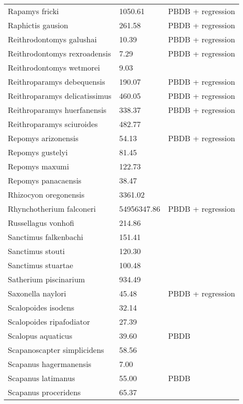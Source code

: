 \documentclass{article}
\begin{document}
\begin{center}
\begin{longtable}{p{} p{} p{} }
  Rapamys fricki & 1050.61 & PBDB + regression \\ 
  Raphictis gausion & 261.58 & PBDB + regression \\ 
  Reithrodontomys galushai & 10.39 & PBDB + regression \\ 
  Reithrodontomys rexroadensis & 7.29 & PBDB + regression \\ 
  Reithrodontomys wetmorei & 9.03 & \cite{Tomiya2013} \\ 
  Reithroparamys debequensis & 190.07 & PBDB + regression \\ 
  Reithroparamys delicatissimus & 460.05 & PBDB + regression \\ 
  Reithroparamys huerfanensis & 338.37 & PBDB + regression \\ 
  Reithroparamys sciuroides & 482.77 & \cite{Wang1994a} \\ 
  Repomys arizonensis & 54.13 & PBDB + regression \\ 
  Repomys gustelyi & 81.45 & \cite{Tomiya2013} \\ 
  Repomys maxumi & 122.73 & \cite{Tomiya2013} \\ 
  Repomys panacaensis & 38.47 & \cite{Tomiya2013} \\ 
  Rhizocyon oregonensis & 3361.02 & \cite{Tomiya2013} \\ 
  Rhynchotherium falconeri & 54956347.86 & PBDB + regression \\ 
  Russellagus vonhofi & 214.86 & \cite{Tomiya2013} \\ 
  Sanctimus falkenbachi & 151.41 & \cite{Tomiya2013} \\ 
  Sanctimus stouti & 120.30 & \cite{Tomiya2013} \\ 
  Sanctimus stuartae & 100.48 & \cite{Tomiya2013} \\ 
  Satherium piscinarium & 934.49 & \cite{Tomiya2013} \\ 
  Saxonella naylori & 45.48 & PBDB + regression \\ 
  Scalopoides isodens & 32.14 & \cite{Tomiya2013} \\ 
  Scalopoides ripafodiator & 27.39 & \cite{Tomiya2013} \\ 
  Scalopus aquaticus & 39.60 & PBDB \\ 
  Scapanoscapter simplicidens & 58.56 & \cite{Tomiya2013} \\ 
  Scapanus hagermanensis & 7.00 & \cite{McKenna2011} \\ 
  Scapanus latimanus & 55.00 & PBDB \\ 
  Scapanus proceridens & 65.37 & \cite{Tomiya2013} \\ 

\end{longtable}
\end{center}
\end{document}
